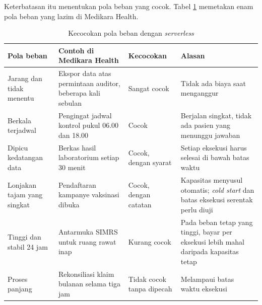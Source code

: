 Keterbatasan itu menentukan pola beban yang cocok. Tabel \ref{tab:ch08-pola-beban} memetakan
enam pola beban yang lazim di Medikara Health.

\begin{table}[!htb]
  \centering
  \caption{Kecocokan pola beban dengan \textit{serverless}}
  \label{tab:ch08-pola-beban}
  \footnotesize
  \begin{tabularx}{\textwidth}{>{\raggedright\arraybackslash}p{2.3cm}
      >{\raggedright\arraybackslash}X >{\raggedright\arraybackslash}p{2.0cm}
      >{\raggedright\arraybackslash}X}
    \hline
    \textbf{Pola beban} & \textbf{Contoh di Medikara Health} & \textbf{Kecocokan} &
      \textbf{Alasan} \\ \hline
    Jarang dan tidak menentu & Ekspor data atas permintaan auditor, beberapa kali sebulan &
      Sangat cocok & Tidak ada biaya saat menganggur \\ \hline
    Berkala terjadwal & Pengingat jadwal kontrol pukul 06.00 dan 18.00 & Cocok & Berjalan
      singkat, tidak ada pasien yang menunggu jawaban \\ \hline
    Dipicu kedatangan data & Berkas hasil laboratorium setiap 30 menit & Cocok, dengan syarat &
      Setiap eksekusi harus selesai di bawah batas waktu \\ \hline
    Lonjakan tajam yang singkat & Pendaftaran kampanye vaksinasi dibuka & Cocok, dengan catatan
      & Kapasitas menyusul otomatis; \textit{cold start} dan batas eksekusi serentak perlu
      diuji \\ \hline
    Tinggi dan stabil 24 jam & Antarmuka SIMRS untuk ruang rawat inap & Kurang cocok & Pada beban
      tetap yang tinggi, bayar per eksekusi lebih mahal daripada kapasitas tetap \\ \hline
    Proses panjang & Rekonsiliasi klaim bulanan selama tiga jam & Tidak cocok tanpa dipecah &
      Melampaui batas waktu eksekusi \\ \hline
  \end{tabularx}
\end{table}

